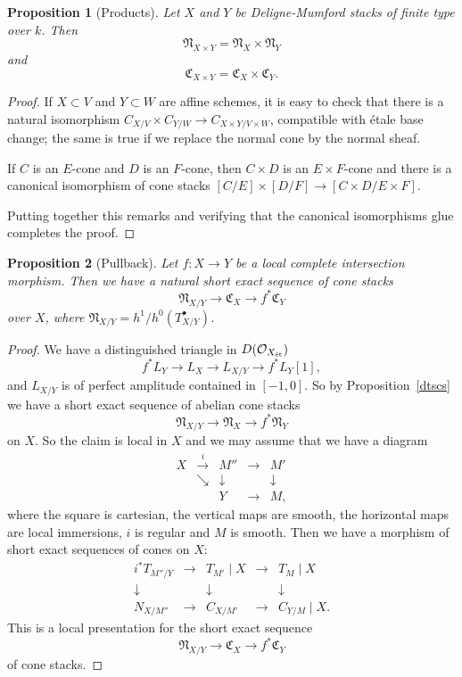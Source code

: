 \documentclass[11pt]{article}
\theoremstyle{plain}
\newtheorem{prop}{Proposition}[section]
\theoremstyle{definition}
\newenvironment{pf}{\begin{proof}}{\end{proof}}
\newcommand{\et}{{\mbox{\tiny \'{e}t}}}
\newcommand{\upst}{^{\ast}}
\newcommand{\com}{^{\scriptscriptstyle\bullet}}
\newcommand{\NN}{{\mathfrak{N}}}
\newcommand{\CC}{{\mathfrak{C}}}
\renewcommand{\O}{{\mathcal{O}}}
\newcommand{\resto}{{ \mid }}
\newcommand{\dt}[6]
{#1\stackrel{#2}{\longrightarrow}#3 \stackrel{#4}{\longrightarrow}#5
\stackrel{#6}{\longrightarrow} #1[1]}
\theoremstyle{plain}
\theoremstyle{definition}
\theoremstyle{remark}
\begin{document}
\begin{prop}[Products] \label{prod}
Let \(X\) and \(Y\) be Deligne-Mumford stacks of finite type over
\(k\). Then
\[
\NN_{X\times Y}=\NN_{X}\times
\NN_{Y}
\]
and
\[
\CC_{X\times Y}=\CC_X\times \CC_Y.
\]
\end{prop}
\begin{pf} If \(X\subset V\) and \(Y\subset W\) are affine schemes, it is easy to
check that there is a natural isomorphism \(C_{X/V}\times
C_{Y/W}\to C_{X\times Y/V\times W}\), compatible with \'etale base change; the
same is true if we replace the normal cone by the normal sheaf.

If \(C\) is an \(E\)-cone and \(D\) is an \(F\)-cone, then \(C\times D\) is an \(E\times
F\)-cone and there is a canonical isomorphism of cone stacks \([C/E]\times
[D/F]\to [C\times D/E\times F]\).

Putting together this remarks and verifying that the canonical isomorphisms
glue completes the proof.
\end{pf}
\begin{prop}[Pullback] \label{fshecs}
Let \(f:X\to Y\) be a local complete intersection morphism. Then we have
a natural short exact sequence of cone stacks
\[
\NN_{X/Y}\longrightarrow\CC_X\longrightarrow f\upst\CC_Y
\]
over \(X\), where \(\NN_{X/Y}=h^1/h^0(T_{X/Y}\com)\).
\end{prop}
\begin{pf}
We have a distinguished triangle in \(D(\O_{X_\et})\)
\[
\dt{f\upst L_Y}{}{L_X}{}{L_{X/Y}}{},
\]
and \(L_{X/Y}\) is of perfect amplitude contained in \([-1,0]\). So by
Proposition~\ref{dtscs} we have a short exact sequence of abelian cone
stacks
\[
\NN_{X/Y}\longrightarrow\NN_X\longrightarrow f\upst\NN_Y
\]
on
\(X\). So the claim is local in \(X\) and we may assume that we have a
diagram
\[
\begin{array}{ccccc}
X & \stackrel{i}{\longrightarrow} & M'' & \longrightarrow & M' \\
 & \searrow & \downarrow & & \downarrow \\
 & & Y & \longrightarrow & M,
\end{array}
\]
where the square is cartesian, the vertical maps are smooth, the
horizontal maps are local immersions, \(i\) is regular and \(M\) is
smooth. Then we have a morphism of short exact sequences of cones on
\(X\):
\[
\begin{array}{ccccc}
i\upst T_{M''/Y} & \longrightarrow & T_{M'}\resto X & \longrightarrow
& T_M\resto X \\
\downarrow & & \downarrow & & \downarrow \\
N_{X/M''} & \longrightarrow & C_{X/M'} & \longrightarrow &
C_{Y/M}\resto X.
\end{array}
\]
This is a local presentation for the short exact sequence
\[
\NN_{X/Y}\longrightarrow\CC_X\longrightarrow f\upst\CC_Y
\]
of cone stacks.
\end{pf}
\end{document}
